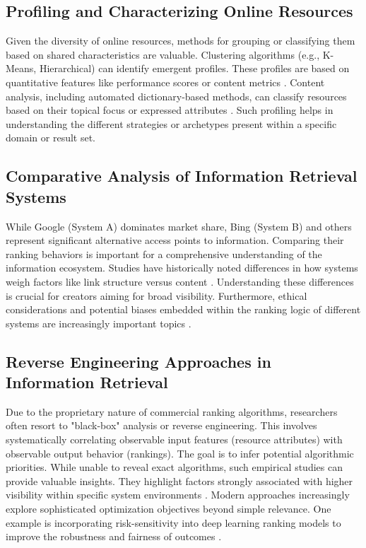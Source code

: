 \documentclass[a4paper,fleqn]{cas-sc}
\begin{document}
\subsection{Profiling and Characterizing Online Resources}
\label{subsec:lit_profiling}
Given the diversity of online resources, methods for grouping or classifying them based on shared characteristics are valuable. Clustering algorithms (e.g., K-Means, Hierarchical) can identify emergent profiles. These profiles are based on quantitative features like performance scores or content metrics \citep{Yu2024}. Content analysis, including automated dictionary-based methods, can classify resources based on their topical focus or expressed attributes \citep{Milei2025}. Such profiling helps in understanding the different strategies or archetypes present within a specific domain or result set.

\subsection{Comparative Analysis of Information Retrieval Systems}
\label{subsec:lit_comparison}
While Google (System A) dominates market share, Bing (System B) and others represent significant alternative access points to information. Comparing their ranking behaviors is important for a comprehensive understanding of the information ecosystem. Studies have historically noted differences in how systems weigh factors like link structure versus content \citep{Toms2004}. Understanding these differences is crucial for creators aiming for broad visibility. Furthermore, ethical considerations and potential biases embedded within the ranking logic of different systems are increasingly important topics \citep{Coghlan2025}.

\subsection{Reverse Engineering Approaches in Information Retrieval}
\label{subsec:lit_reverse}
Due to the proprietary nature of commercial ranking algorithms, researchers often resort to "black-box" analysis or reverse engineering. This involves systematically correlating observable input features (resource attributes) with observable output behavior (rankings). The goal is to infer potential algorithmic priorities. While unable to reveal exact algorithms, such empirical studies can provide valuable insights. They highlight factors strongly associated with higher visibility within specific system environments \citep{Bardas2025}. Modern approaches increasingly explore sophisticated optimization objectives beyond simple relevance. One example is incorporating risk-sensitivity into deep learning ranking models to improve the robustness and fairness of outcomes \citep{SilvaRodrigues2025}.
\end{document}
